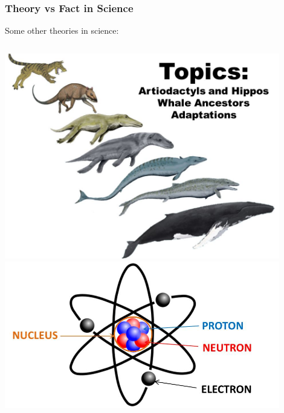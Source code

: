 \documentclass[10pt]{beamer}
\begin{document}
\begin{frame}[t]
\frametitle{Theory vs Fact in Science}
\vspace{0.5cm}

	\begin{center}
		\textcolor{myblue}{Some other theories in science:}\\
	\end{center}
	
	\vspace{0.25cm}
	
	\begin{columns}
		\begin{column}{0.33\textwidth}
			\begin{center}
				\includegraphics[width=0.9\textwidth]{figures/evolution.jpg}\\
				\vspace{1.0cm}
				\includegraphics[width=0.9\textwidth]{figures/atom.jpg}\\
			\end{center}
		\end{column}
		

\end{columns}
\end{frame}
\end{document}
